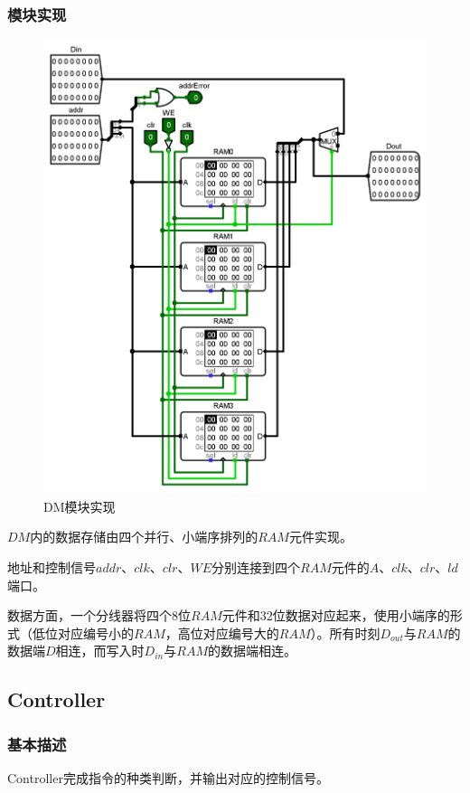 \documentclass[main.tex]{subfiles}
\begin{document}
\subsubsection{模块实现}
\begin{figure}[h]
\centering
\includegraphics[width=\textwidth]{images/DM-circuit.png}
\caption{DM模块实现}
\end{figure}
$DM$内的数据存储由四个并行、小端序排列的$RAM$元件实现。

地址和控制信号$addr$、$clk$、$clr$、$WE$分别连接到四个$RAM$元件的$A$、$clk$、$clr$、$ld$端口。

数据方面，一个分线器将四个8位$RAM$元件和32位数据对应起来，使用小端序的形式（低位对应编号小的$RAM$，高位对应编号大的$RAM$）。所有时刻$D_{out}$与$RAM$的数据端$D$相连，而写入时$D_{in}$与$RAM$的数据端相连。

\clearpage
\subsection{Controller}
\subsubsection{基本描述}
Controller完成指令的种类判断，并输出对应的控制信号。
\end{document}
